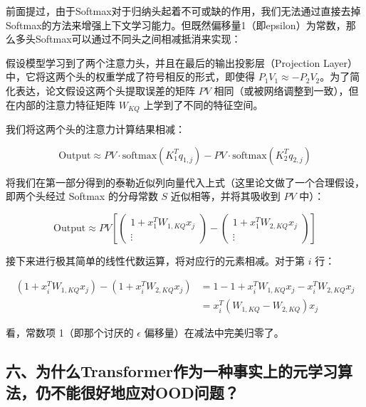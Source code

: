 前面提过，由于Softmax对于归纳头起着不可或缺的作用，我们无法通过直接去掉Softmax的方法来增强上下文学习能力。但既然偏移量1（即epsilon）为常数，那么多头Softmax可以通过不同头之间相减抵消来实现：

假设模型学习到了两个注意力头，并且在最后的输出投影层（Projection Layer）中，它将这两个头的权重学成了符号相反的形式，即使得 \(P_1V_1 \approx -P_2V_2\)。为了简化表达，论文假设这两个头提取误差的矩阵 \(PV\) 相同（或被网络调整到一致），但在内部的注意力特征矩阵 \(W_{KQ}\) 上学到了不同的特征空间。

我们将这两个头的注意力计算结果相减：

\[
\mathrm{Output} \approx PV \cdot \mathrm{softmax}(K_1^Tq_{1,j}) - PV \cdot \mathrm{softmax}(K_2^Tq_{2,j})
\]

将我们在第一部分得到的泰勒近似列向量代入上式（这里论文做了一个合理假设，即两个头经过 Softmax 的分母常数 \(S\) 近似相等，并将其吸收到 \(PV\) 中）：

\[
\mathrm{Output} \approx PV \left[
\begin{pmatrix}
1+x_1^TW_{1,KQ}x_j \\
\vdots
\end{pmatrix}
-
\begin{pmatrix}
1+x_1^TW_{2,KQ}x_j \\
\vdots
\end{pmatrix}
\right]
\]

接下来进行极其简单的线性代数运算，将对应行的元素相减。对于第 \(i\) 行：

\[
\begin{aligned}
(1+x_i^TW_{1,KQ}x_j)-(1+x_i^TW_{2,KQ}x_j)
&= 1-1+x_i^TW_{1,KQ}x_j-x_i^TW_{2,KQ}x_j \\
&= x_i^T(W_{1,KQ}-W_{2,KQ})x_j
\end{aligned}
\]

看，常数项 1（即那个讨厌的 \(\epsilon\) 偏移量）在减法中完美归零了。

\hypertarget{ux516dux4e3aux4ec0ux4e48transformerux4f5cux4e3aux4e00ux79cdux4e8bux5b9eux4e0aux7684ux5143ux5b66ux4e60ux7b97ux6cd5ux4ecdux4e0dux80fdux5f88ux597dux5730ux5e94ux5bf9oodux95eeux9898}{%
\subsection{六、为什么Transformer作为一种事实上的元学习算法，仍不能很好地应对OOD问题？}\label{ux516dux4e3aux4ec0ux4e48transformerux4f5cux4e3aux4e00ux79cdux4e8bux5b9eux4e0aux7684ux5143ux5b66ux4e60ux7b97ux6cd5ux4ecdux4e0dux80fdux5f88ux597dux5730ux5e94ux5bf9oodux95eeux9898}}

